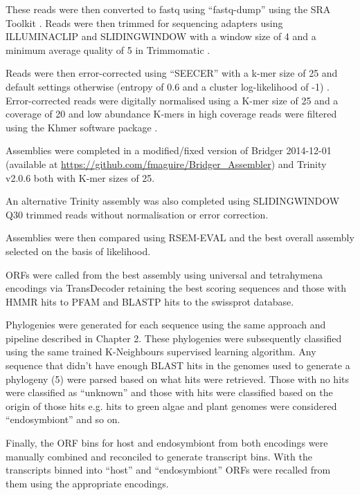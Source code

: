 These reads were then converted to fastq using ``fastq-dump'' using the SRA Toolkit
\citep{NationalCenterforBiotechnologyInformation2011}.  Reads were then trimmed
for sequencing adapters using ILLUMINACLIP and SLIDINGWINDOW with a window size
of 4 and a minimum average quality of 5 in Trimmomatic \citep{Bolger2014a}.

Reads were then error-corrected using ``SEECER'' with a k-mer size of 25 and 
default settings otherwise (entropy of 0.6 and a cluster log-likelihood
of -1) \citep{Le2013}.  Error-corrected reads were digitally normalised
using a K-mer size of 25 and a coverage of 20 \citep{Brown2012} and 
low abundance K-mers in high coverage reads were filtered \citep{Zhang2014,Zhang2015}
using the Khmer software package \citep{Doring2008,Crusoe2015}.

Assemblies were completed in a modified/fixed version of 
Bridger 2014-12-01 \citep{Chang2015} (available at
\url{https://github.com/fmaguire/Bridger_Assembler}) and 
Trinity v2.0.6 \citep{Grabherr2011,Haas2013} both with K-mer
sizes of 25.

An alternative Trinity assembly was also completed using
SLIDINGWINDOW Q30 trimmed reads without normalisation or 
error correction.

Assemblies were then compared using RSEM-EVAL \citep{Li2014} and the best
overall assembly selected on the basis of likelihood.

ORFs were called from the best assembly using universal and tetrahymena encodings 
via TransDecoder \citep{Haas2013} retaining the best scoring sequences and those
with HMMR hits to PFAM and BLASTP hits to the swissprot database. 

Phylogenies were generated for each sequence using the same approach and pipeline
described in Chapter 2. These phylogenies were subsequently classified using the 
same trained K-Neighbours supervised learning algorithm.
Any sequence that didn't have enough BLAST hits in the genomes used to generate
a phylogeny (5) were parsed based on what hits were retrieved.
Those with no hits were classified as ``unknown'' and those with
hits were classified based on the origin of those hits e.g. hits
to green algae and plant genomes were considered ``endosymbiont'' and so on.

Finally, the ORF bins for host and endosymbiont 
from both encodings were manually combined and reconciled
to generate transcript bins.  With the transcripts binned into
``host'' and ``endosymbiont'' ORFs were recalled from them using the appropriate
encodings. 

